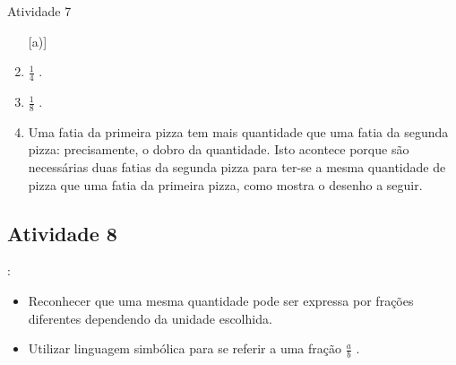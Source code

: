 \begin{multicols}{2}
\begin{resposta*}{Atividade 7}
\begin{enumerate} [\quad a)] %
    \item             $\frac{1}{4}$      .
    \item             $\frac{1}{8}$      .
    \item       Uma fatia da primeira pizza tem mais quantidade que uma fatia da segunda pizza: precisamente, o dobro da quantidade. Isto acontece porque são necessárias duas fatias da segunda pizza para ter-se a mesma quantidade de pizza que uma fatia da primeira pizza, como mostra o desenho a seguir.
\end{enumerate} %
\begin{center}
        \quad \quad
\end{center}
\end{resposta*}





\subsection{Atividade 8}


   \vspace{.1cm}:

  \begin{itemize} %
    \item       Reconhecer que uma mesma quantidade pode ser expressa por frações diferentes dependendo da unidade escolhida.
    \item       Utilizar linguagem simbólica para se referir a uma fração       $\frac{a}{b}$      .
\end{itemize} %


  \vspace{.1cm} 
  

\end{multicols}
